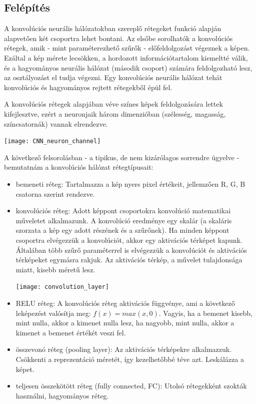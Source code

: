 \subsection{Felépítés}

A konvolúciós neurális hálózatokban szereplő rétegeket funkció alapján alapvetően két csoportra lehet bontani. Az elsőbe sorolhatók a konvolúciós rétegek, amik - mint paraméterezhető szűrők - előfeldolgozást végeznek a képen. Ezáltal a kép mérete lecsökken, a hordozott információtartalom kiemeltté válik, és a hagyományos neurális hálózat (második csoport) számára feldolgozható lesz, az osztályozást el tudja végezni. Egy konvolúciós neurális hálózat tehát konvolúciós és hagyományos rejtett rétegekből épül fel.

A konvolúciós rétegek alapjában véve színes képek feldolgozására lettek kifejlesztve, ezért a neuronjaik három dimenzióban (szélesség, magasság, színcsatornák) vannak elrendezve.

\begin{center}
\texttt{[image: CNN\_neuron\_channel]}
\end{center}

A következő felsorolásban - a tipikus, de nem kizárólagos sorrendre ügyelve - bemutatnám a konvolúciós hálózat rétegtípusait:
\begin{itemize}
\item bemeneti réteg: Tartalmazza a kép nyers pixel értékeit, jellemzően R, G, B csatorna szerint rendezve.
\item konvolúciós réteg: Adott képpont csoportokra konvolúció matematikai műveletet alkalmazunk. A konvolúció eredménye egy skalár (a skaláris szorzata a kép egy adott részének és a szűrőnek). Ha minden képpont csoportra elvégezzük a konvolúciót, akkor egy aktivációs térképet kapunk. Általában több szűrő paraméterrel is elvégezzük a konvolúciót és aktivációs térképeket egymásra rakjuk. Az aktivációs térkép, a művelet tulajdonsága miatt, kisebb
méretű lesz.

\begin{center}
\texttt{[image: convolution\_layer]}
\end{center}

\item RELU réteg: A konvolúciós réteg aktivációs függvénye, ami a következő leképezést valósítja meg: \(f(x) = max(x, 0)\). Vagyis, ha a bemenet kisebb, mint nulla, akkor a kimenet nulla lesz, ha nagyobb, mint nulla, akkor a kimenet a bemenet értékét veszi fel.
\item összevonó réteg (pooling layer): Az aktivációs térképekre alkalmazzuk. Csökkenti a reprezentáció méretét, így kezelhetőbbé téve azt. Leskálázza a képet.
\item teljesen összekötött réteg (fully connected, FC): Utolsó rétegekként szokták használni, hagyományos réteg. 
\end{itemize}

